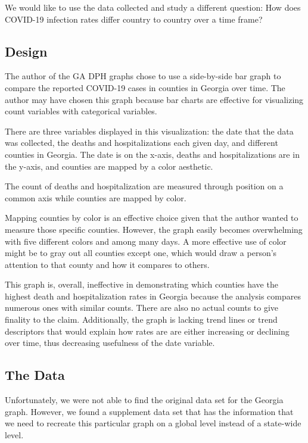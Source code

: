 \documentclass[
]{article}
\begin{document}
We would like to use the data collected and study a different question:
How does COVID-19 infection rates differ country to country over a time
frame?

\hypertarget{design}{%
\subsection{Design}\label{design}}

The author of the GA DPH graphs chose to use a side-by-side bar graph to
compare the reported COVID-19 cases in counties in Georgia over time.
The author may have chosen this graph because bar charts are effective
for visualizing count variables with categorical variables.

There are three variables displayed in this visualization: the date that
the data was collected, the deaths and hospitalizations each given day,
and different counties in Georgia. The date is on the x-axis, deaths and
hospitalizations are in the y-axis, and counties are mapped by a color
aesthetic.

The count of deaths and hospitalization are measured through position on
a common axis while counties are mapped by color.

Mapping counties by color is an effective choice given that the author
wanted to measure those specific counties. However, the graph easily
becomes overwhelming with five different colors and among many days. A
more effective use of color might be to gray out all counties except
one, which would draw a person's attention to that county and how it
compares to others.

This graph is, overall, ineffective in demonstrating which counties have
the highest death and hospitalization rates in Georgia because the
analysis compares numerous ones with similar counts. There are also no
actual counts to give finality to the claim. Additionally, the graph is
lacking trend lines or trend descriptors that would explain how rates
are are either increasing or declining over time, thus decreasing
usefulness of the date variable.

\hypertarget{the-data}{%
\subsection{The Data}\label{the-data}}

Unfortunately, we were not able to find the original data set for the
Georgia graph. However, we found a supplement data set that has the
information that we need to recreate this particular graph on a global
level instead of a state-wide level.
\end{document}
